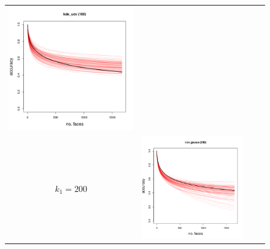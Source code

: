 \documentclass[twoside,11pt]{article}
\newenvironment{myfont}{\fontfamily{phv}\selectfont}{\par}
\begin{document}
\begin{figure}[t]
\begin{tabular}{cccc}
\includegraphics[scale = 0.2, clip = true, trim = 0 0 0 0.6in, valign=c]{repeat_100_kde_ucv.png} \\
\begin{myfont}$k_1 = 200$\end{myfont} & 
\includegraphics[scale = 0.2, clip = true, trim = 0 0 0 0.6in, valign=c]{repeat_200_r_cv_gauss.png} &

\end{tabular}
\end{figure}
\end{document}
